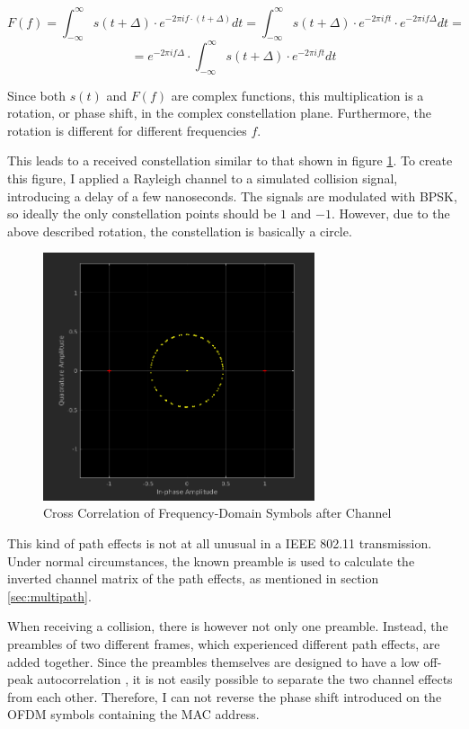 $$ F(f) = \int_{-\infty}^{\infty} s(t + \Delta) \cdot e^{-2 \pi i f \cdot (t + \Delta)} dt = \int_{-\infty}^{\infty} s(t + \Delta) \cdot e^{-2 \pi i f t} \cdot e^{-2 \pi i f \Delta} dt = $$
$$ = e^{-2 \pi i f \Delta} \cdot \int_{-\infty}^{\infty} s(t + \Delta) \cdot e^{-2 \pi i f t} dt $$\vspace{0cm}

Since both $ s(t) $ and $ F(f) $ are complex functions, this multiplication is a rotation, or phase shift, in the complex constellation plane. Furthermore, the rotation is different for different frequencies $ f $.

This leads to a received constellation similar to that shown in figure \ref{fig:freqd-corr}. To create this figure, I applied a Rayleigh channel \cite{sklar1997} to a simulated collision signal, introducing a delay of a few nanoseconds. The signals are modulated with \gls{BPSK}, so ideally the only constellation points should be $ 1 $ and $ -1 $. However, due to the above described rotation, the constellation is basically a circle.

\begin{figure}[ht]
	\centering
	\includegraphics[width=8cm]{gfx/images/freqd-correlation}
	\caption{Cross Correlation of Frequency-Domain Symbols after Channel}
	\label{fig:freqd-corr}
\end{figure}

This kind of path effects is not at all unusual in a IEEE 802.11 transmission. Under normal circumstances, the known preamble is used to calculate the inverted channel matrix of the path effects, as mentioned in section \ref{sec:multipath}.

When receiving a collision, there is however not only one preamble. Instead, the preambles of two different frames, which experienced different path effects, are added together. Since the preambles themselves are designed to have a low off-peak autocorrelation \cite{ieee2012}, it is not easily possible to separate the two channel effects from each other. Therefore, I can not reverse the phase shift introduced on the \gls{OFDM} symbols containing the \gls{MAC} address.

